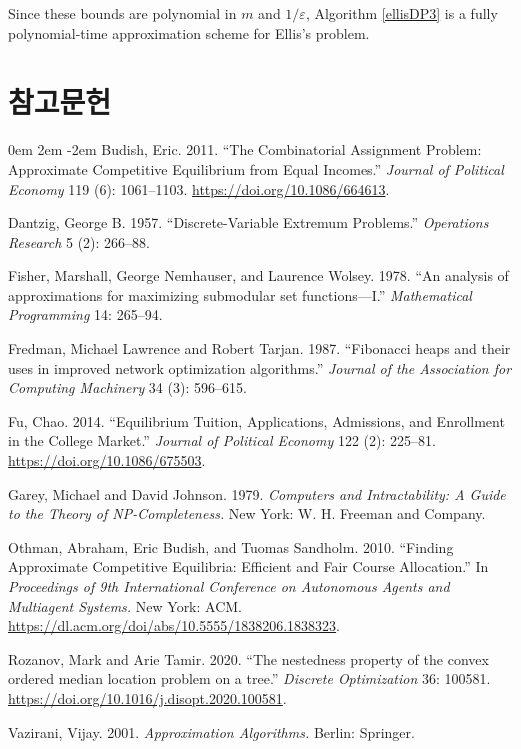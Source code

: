 \documentclass[12pt]{article} %
\newif\ifEN
\theoremstyle{definition}
\theoremstyle{definition}
\begin{document}
Since these bounds are polynomial in $m$ and $1 / \varepsilon$, Algorithm \ref{ellisDP3} is a fully polynomial-time approximation scheme for Ellis's problem. 




\pagebreak
\ifEN \section{References} \else \section{참고문헌} \fi
\noindent

\parskip 0em
\leftskip 2em
\parindent -2em
Budish, Eric. 2011. ``The Combinatorial Assignment Problem: Approximate Competitive Equilibrium from Equal Incomes.'' \emph{Journal of Political Economy} 119 (6): 1061--1103. \url{https://doi.org/10.1086/664613}. 

Dantzig, George B. 1957. ``Discrete-Variable Extremum Problems.'' \emph{Operations Research} 5 (2): 266--88.

Fisher, Marshall, George Nemhauser, and Laurence Wolsey. 1978. ``An analysis of approximations for maximizing submodular set functions—I.'' \emph{Mathematical Programming} 14: 265--94. 

Fredman, Michael Lawrence and Robert Tarjan. 1987. ``Fibonacci heaps and their uses in improved network optimization algorithms.'' \emph{Journal of the Association for Computing Machinery} 34 (3): 596--615.

Fu, Chao. 2014. ``Equilibrium Tuition, Applications, Admissions, and Enrollment in the College Market.'' \emph{Journal of Political Economy} 122 (2): 225--81. \url{https://doi.org/10.1086/675503}. 

Garey, Michael and David Johnson. 1979. \emph{Computers and Intractability: A Guide to the Theory of NP-Completeness.} New York: W. H. Freeman and Company. 

Othman, Abraham, Eric Budish, and Tuomas Sandholm. 2010. ``Finding Approximate Competitive Equilibria: Efficient and Fair
Course Allocation.'' In \emph{Proceedings of 9th International Conference on Autonomous Agents and Multiagent Systems.} New York: ACM. \url{https://dl.acm.org/doi/abs/10.5555/1838206.1838323}.

Rozanov, Mark and Arie Tamir. 2020. ``The nestedness property of the convex ordered median location problem on a tree.'' \emph{Discrete Optimization} 36: 100581. \url{https://doi.org/10.1016/j.disopt.2020.100581}.

Vazirani, Vijay. 2001. \emph{Approximation Algorithms.} Berlin: Springer. 
\end{document}
